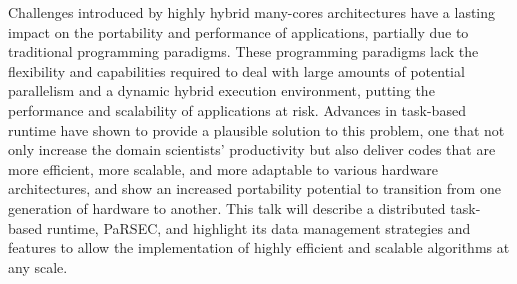 Challenges introduced by highly hybrid many-cores architectures have a lasting impact on the portability and performance of applications, partially due to traditional programming paradigms. These programming paradigms lack the flexibility and capabilities required to deal with large amounts of potential parallelism and a dynamic hybrid execution environment, putting the performance and scalability of applications at risk. Advances in task-based runtime have shown to provide a plausible solution to this problem, one that not only increase the domain scientists’ productivity but also deliver codes that are more efficient, more scalable, and more adaptable to various hardware architectures, and show an increased portability potential to transition from one generation of hardware to another. This talk will describe a distributed task-based runtime, PaRSEC, and highlight its data management strategies and features to allow the implementation of highly efficient and scalable algorithms at any scale.